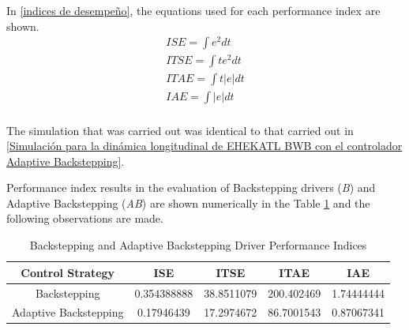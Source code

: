 In \ref{indices de desempeño}, the equations used for each performance index are shown. 
\begin{align}
\label{indices de desempeño}
    ISE = \int e^2  dt \\ \nonumber
    ITSE = \int t e^2 dt \\ \nonumber
    ITAE = \int t |e| dt \\ \nonumber
    IAE = \int |e| dt \\ \nonumber
\end{align}

%
The simulation that was carried out was identical to that carried out in \ref{Simulación para la dinámica longitudinal de EHEKATL BWB con el controlador Adaptive Backstepping}.

Performance index results in the evaluation of Backstepping drivers (\textit{B}) and Adaptive Backstepping (\textit{AB}) are shown numerically in the Table \ref{Indices de desempeño de controladores Backstepping y Adaptive Backstepping} and the following observations are made.

\begin{table}[!h]
    \caption{Backstepping and Adaptive Backstepping Driver Performance Indices}
    \centering
    \begin{tabular}{|c|c|c|c|c|}
    \hline
    \textbf{Control Strategy} & \textbf{ISE} & \textbf{ITSE} & \textbf{ITAE} & \textbf{IAE} \\
    \hline
    Backstepping  & 0.354388888 & 38.8511079 & 200.402469 & 1.74444444 \\
    Adaptive Backstepping & 0.17946439 & 17.2974672 & 86.7001543 & 0.87067341 \\
    \hline
    \end{tabular}
    \label{Indices de desempeño de controladores Backstepping y Adaptive Backstepping}
\end{table}


